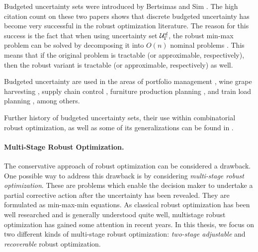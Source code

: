 Budgeted uncertainty sets were introduced by Bertsimas and Sim \cite{bertsimas2003robust,bertsimas2004price}. 
The high citation count on these two papers shows that discrete budgeted uncertainty has become very successful in the robust optimization literature. 
The reason for this success is the fact that when using uncertainty set $\mathcal{U}_\Gamma^ d$, the robust min-max problem can be solved by decomposing it into $O(n)$ nominal problems \cite{bertsimas2003robust}. This means that if the original problem is tractable (or approximable, respectively), then the robust variant is tractable (or approximable, respectively) as well.

Budgeted uncertainty are used in the areas of portfolio management \cite{bertsimas2008robust}, wine grape harvesting \cite{bohle2010robust}, supply
chain control \cite{bertsimas2006robust}, furniture production planning \cite{alem2012production}, and train load planning \cite{bruns2014robust}, among others. 


Further history of budgeted uncertainty sets, their use within combinatorial robust optimization, as well as some of its generalizations can be found in \cite{poss2018robust,goerigk2023robust,goerigk2021robust}.

\paragraph*{Multi-Stage Robust Optimization.}
The conservative approach of robust optimization can be considered a drawback. One possible way to address this drawback is by considering \emph{multi-stage robust optimization}. 
These are problems which enable the decision maker to undertake a partial corrective action after the uncertainty has been revealed. They are formulated as min-max-min equations.
As classical robust optimization has been well researched and is generally understood quite well, multistage robust optimization has gained some attention in recent years. In this thesis, we focus on two different kinds of multi-stage robust optimization:  \emph{two-stage adjustable} and \emph{recoverable} robust optimization.

